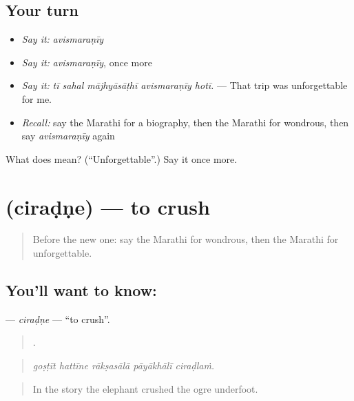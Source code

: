 \subsection*{Your turn}
\begin{itemize}
\raggedright
  \item \emph{Say it:} \emph{avismaraṇīy}
  \item \emph{Say it:} \emph{avismaraṇīy}, once more
  \item \emph{Say it:} \emph{tī sahal mājhyāsāṭhī avismaraṇīy hotī.} — That trip was unforgettable for me.
  \item \emph{Recall:} say the Marathi for a biography, then the Marathi for wondrous, then say \emph{avismaraṇīy} again
\end{itemize}

\begin{tcolorbox}[breakable,colback=teal!4,colframe=teal!35!black,title={Before you move on}]
What does  mean? (\textquotedblleft{}Unforgettable\textquotedblright{}.) Say it once more.
\end{tcolorbox}
\section[\texorpdfstring{\mr{चिरडणे} (ciraḍṇe)}{चिरडणे (ciraḍṇe)}]{ (ciraḍṇe) — to crush}

\label{lesson:MR-C341-ciradne}



\begin{quote}
Before the new one: say the Marathi for wondrous, then the Marathi for unforgettable.
\end{quote}

\subsection*{You'll want to know: }
\textbf{} — \emph{ciraḍṇe} — \textquotedblleft{}to crush\textquotedblright{}.

\begin{quote}
    .
\end{quote}

\begin{quote}
\emph{goṣṭīt hattīne rākṣasālā pāyākhālī ciraḍlaṁ.}
\end{quote}

\begin{quote}
In the story the elephant crushed the ogre underfoot.
\end{quote}

